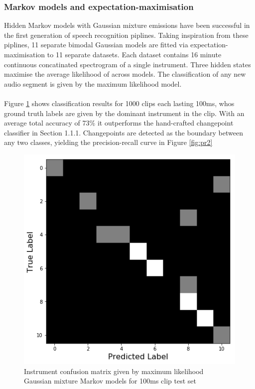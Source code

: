 \documentclass{article}[12pt]
\numberwithin{equation}{section}
\begin{document}
\subsubsection{Markov models and expectation-maximisation} Hidden Markov models
with Gaussian mixture emissions have been successful in the first generation of
speech recognition piplines. Taking inspiration from these piplines, 11 separate
bimodal Gaussian models are fitted via expectation-maximisation to 11 separate datasets. Each dataset
contains 16 minute continuous concatinated spectrogram of a single instrument. Three
hidden states maximise the average likelihood of across models. The classification
of any new audio segment is given by the maximum likelihood model.
\\\\
Figure \ref{fig:confusion} shows classification results for 1000 clips each
lasting 100ms, whos ground truth labels are given by the dominant instrument in
the clip. With an average total accuracy of 73\% it outperforms the hand-crafted changepoint
classifier in Section 1.1.1. Changepoints are detected as the boundary between
any two classes, yielding the precision-recall curve in Figure \ref{fig:pr2}
\begin{figure}[H]
\centering{}
\captionsetup{justification=centering}
\includegraphics[scale=0.42]{confusion}
\caption{
Instrument confusion matrix given by maximum likelihood \\
Gaussian mixture Markov models for 100ms clip test set
}
\label{fig:confusion}
\end{figure}
\end{document}
